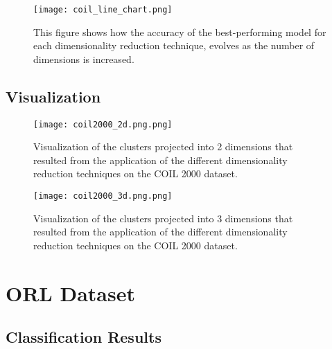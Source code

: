 \begin{figure}[!h]
    \centering
    \texttt{[image: coil\_line\_chart.png]}
    \caption{This figure shows how the accuracy of the best-performing model for each dimensionality reduction technique, evolves as the number of dimensions is increased.}
    \label{fig:coil_line_chart}
\end{figure}

\subsection{Visualization}

\begin{figure}[!h]
    \centering
    \texttt{[image: coil2000\_2d.png.png]}
    \caption{Visualization of the clusters projected into 2 dimensions that resulted from the application of the different dimensionality reduction techniques on the COIL 2000 dataset.}
    \label{fig:coil-2d}
\end{figure}

\begin{figure}[!h]
    \centering
    \texttt{[image: coil2000\_3d.png.png]}
    \caption{Visualization of the clusters projected into 3 dimensions that resulted from the application of the different dimensionality reduction techniques on the COIL 2000 dataset.}
    \label{fig:coil-3d}
\end{figure}

\section{ORL Dataset}

\subsection{Classification Results}

